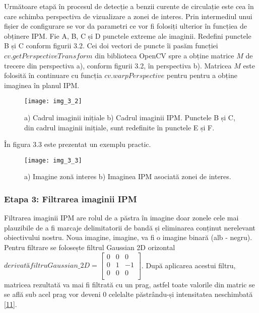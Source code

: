 Următoare etapă în procesul de detecție a benzii curente de circulație este cea în care schimba perspectiva de vizualizare a zonei de interes. Prin intermediul unui fișier de configurare se vor da parametri ce vor fi folosiți ulterior în funcțiea de obținere IPM. Fie A, B, C și D punctele extreme ale imaginii. Redefini punctele B și C conform figurii 3.2. Cei doi vectori de puncte îi pasăm funcției $cv.getPerspectiveTransform$ din biblioteca OpenCV spre a obține matrice $M$ de trecere din perspectiva a), conform figurii 3.2, în perspectiva b). Matricea $M$ este folosită în continuare cu funcția $cv.warpPerspective$ pentru pentru a obține imaginea în planul IPM.
\begin{figure}[!h]
	\centering
	\texttt{[image: img\_3\_2]}
	\caption[Transformare IPM]{a) Cadrul imaginii inițiale b) Cadrul imaginii IPM. Punctele B și C, din cadrul imaginii inițiale, sunt redefinite în punctele E și F.}
\end{figure}

În figura 3.3 este prezentat un exemplu practic.
\begin{figure}[!h]
	\centering
	\texttt{[image: img\_3\_3]}
	\caption[Transformare IPM în practică]{a) Imagine zonă interes b) Imaginea IPM asociată zonei de interes.}
\end{figure}


\subsubsection*{Etapa 3: Filtrarea imaginii IPM}

Filtrarea imaginii IPM are rolul de a păstra în imagine doar zonele cele mai plauzibile de a fi marcaje delimitatorii de bandă și eliminarea conținut nerelevant obiectivului nostru. Noua imagine, imagine, va fi o imagine binară (alb - negru). Pentru filtrare se folosește filtrul Gaussian 2D orizontal
$ derivatăfiltruGaussian\_2D = 
\begin{bmatrix}
	0 & 0 & 0 \\
	0 & 1 & -1 \\
	0 & 0 & 0 \\
\end{bmatrix}
$. După aplicarea acestui filtru, matricea rezultată va mai fi filtrată cu un prag, astfel toate valorile din matric se se află sub acel prag vor deveni 0 celelalte păstrându-și intensitatea neschimbată \hyperlink{WaymoSystem}{[11]}.

